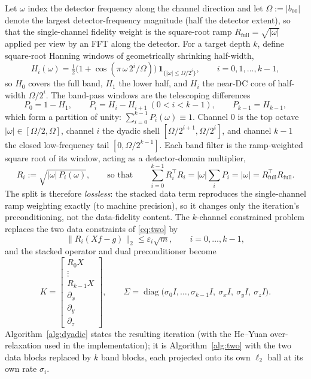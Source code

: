 \documentclass{article}
\newcommand{\diag}{\operatorname{diag}}
\newcommand{\ind}{\mathbf{1}}         %
\begin{document}
Let $\omega$ index the detector frequency along the channel direction and let $\Omega:=|b_{00}|$ denote the largest detector-frequency magnitude (half the detector extent), so that the single-channel fidelity weight is the square-root ramp $R_{\mathrm{full}}=\sqrt{|\omega|}$ applied per view by an FFT along the detector. For a target depth $k$, define square-root Hanning windows of geometrically shrinking half-width,
\begin{equation}
    H_{i}(\omega)=\tfrac12\bigl(1+\cos(\pi\,\omega\,2^{i}/\Omega)\bigr)\,\ind_{\{|\omega|\le \Omega/2^{i}\}},\qquad i=0,1,\dots,k-1,
    \label{eq:dyadic-hann}
\end{equation}
so $H_{0}$ covers the full band, $H_{1}$ the lower half, and $H_{i}$ the near-DC core of half-width $\Omega/2^{i}$. The band-pass windows are the telescoping differences
\begin{equation}
    P_{0}=1-H_{1},\qquad P_{i}=H_{i}-H_{i+1}\ (0<i<k-1),\qquad P_{k-1}=H_{k-1},
    \label{eq:dyadic-bands}
\end{equation}
which form a partition of unity: $\sum_{i=0}^{k-1}P_{i}(\omega)\equiv1$. Channel $0$ is the top octave $|\omega|\in[\Omega/2,\Omega]$, channel $i$ the dyadic shell $[\Omega/2^{i+1},\Omega/2^{i}]$, and channel $k-1$ the closed low-frequency tail $[0,\Omega/2^{k-1}]$. Each band filter is the ramp-weighted square root of its window, acting as a detector-domain multiplier,
\begin{equation}
    R_{i}:=\sqrt{|\omega|\,P_{i}(\omega)},\qquad\text{so that}\qquad
    \sum_{i=0}^{k-1}R_{i}^\top R_{i}=|\omega|\sum_{i}P_{i}=|\omega|=R_{\mathrm{full}}^\top R_{\mathrm{full}}.
    \label{eq:dyadic-partition}
\end{equation}
The split is therefore \emph{lossless}: the stacked data term reproduces the single-channel ramp weighting exactly (to machine precision), so it changes only the iteration's preconditioning, not the data-fidelity content. The $k$-channel constrained problem replaces the two data constraints of \eqref{eq:two} by
\begin{equation}
    \|R_{i}(Xf-g)\|_{2}\le\varepsilon_{i}\sqrt{m},\qquad i=0,\dots,k-1,
    \label{eq:dyadic-constraints}
\end{equation}
and the stacked operator and dual preconditioner become
\begin{equation}
    K=\begin{bmatrix}R_{0}X\\ \vdots\\ R_{k-1}X\\ \partial_x\\ \partial_y\\ \partial_z\end{bmatrix},\qquad
    \Sigma=\diag\!\bigl(\sigma_{0}I,\dots,\sigma_{k-1}I,\ \sigma_x I,\ \sigma_y I,\ \sigma_z I\bigr).
    \label{eq:dyadic-K}
\end{equation}
Algorithm~\ref{alg:dyadic} states the resulting iteration (with the He--Yuan over-relaxation used in the implementation); it is Algorithm~\ref{alg:two} with the two data blocks replaced by $k$ band blocks, each projected onto its own $\ell_2$ ball at its own rate $\sigma_i$.
\end{document}

